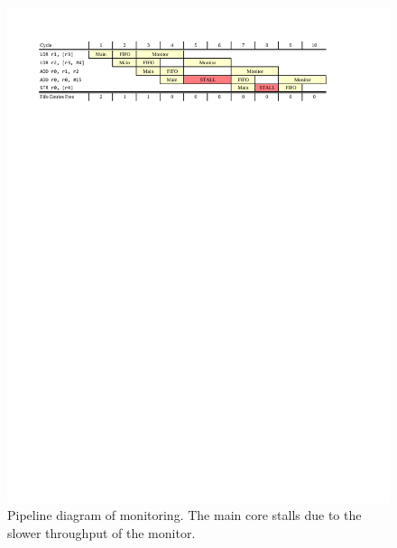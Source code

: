 \begin{figure}
  \begin{center}
    \includegraphics[width=\linewidth]{figs/monitoring_wcet/pipeline.pdf}
    \vspace{-0.3in}
    \caption{Pipeline diagram of monitoring. The main core stalls due to the
    slower throughput of the monitor.}
    \label{fig:monitoring.pipeline}
    \vspace{-0.2in}
  \end{center}
\end{figure}

